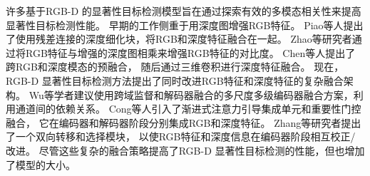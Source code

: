 %
%
%
%
%
%




许多基于RGB-D 的显著性目标检测模型旨在通过探索有效的多模态相关性来提高显著性目标检测性能。
早期的工作侧重于用深度图增强RGB特征。
Piao等人提出了使用残差连接的深度细化块，将RGB和深度特征融合在一起。
Zhao等研究者通过将RGB特征与增强的深度图相乘来增强RGB特征的对比度。
Chen等人提出了跨RGB和深度模态的预融合，
随后通过三维卷积进行深度特征融合。
现在，RGB-D 显著性目标检测方法提出了同时改进RGB特征和深度特征的复杂融合架构。
Wu等学者建议使用跨域监督和解码器融合的多尺度多级编码器融合方案，利用通道间的依赖关系。
Cong等人引入了渐进式注意力引导集成单元和重要性门控融合，
它在编码器和解码器阶段分别集成RGB和深度特征。
Zhang等研究者提出了一个双向转移和选择模块，
以使RGB特征和深度信息在编码器阶段相互校正/改进。
尽管这些复杂的融合策略提高了RGB-D 显著性目标检测的性能，但也增加了模型的大小。




